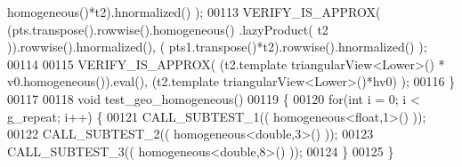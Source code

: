 \begin{DoxyCode}
      homogeneous()*t2).hnormalized() );
00113   VERIFY\_IS\_APPROX( (pts.transpose().rowwise().homogeneous() .lazyProduct( t2 )).rowwise().hnormalized(), (
      pts1.transpose()*t2).rowwise().hnormalized() );
00114 
00115   VERIFY\_IS\_APPROX( (t2.template triangularView<Lower>() * v0.homogeneous()).eval(), (t2.template 
      triangularView<Lower>()*hv0) );
00116 \}
00117 
00118 \textcolor{keywordtype}{void} test\_geo\_homogeneous()
00119 \{
00120   \textcolor{keywordflow}{for}(\textcolor{keywordtype}{int} i = 0; i < g\_repeat; i++) \{
00121     CALL\_SUBTEST\_1(( homogeneous<float,1>() ));
00122     CALL\_SUBTEST\_2(( homogeneous<double,3>() ));
00123     CALL\_SUBTEST\_3(( homogeneous<double,8>() ));
00124   \}
00125 \}
\end{DoxyCode}
